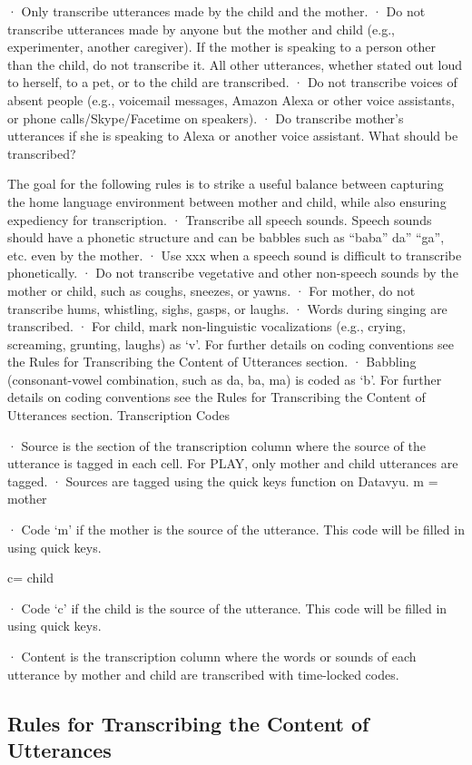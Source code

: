 \documentclass[
  12pt,
]{book}
\begin{document}
· Only transcribe utterances made by the child and the mother.
· Do not transcribe utterances made by anyone but the mother and child (e.g., experimenter, another caregiver). If the mother is speaking to a person other than the child, do not transcribe it. All other utterances, whether stated out loud to herself, to a pet, or to the child are transcribed.
· Do not transcribe voices of absent people (e.g., voicemail messages, Amazon Alexa or other voice assistants, or phone calls/Skype/Facetime on speakers).
· Do transcribe mother's utterances if she is speaking to Alexa or another voice assistant.
What should be transcribed?

The goal for the following rules is to strike a useful balance between capturing the home language environment between mother and child, while also ensuring expediency for transcription.
· Transcribe all speech sounds. Speech sounds should have a phonetic structure and can be babbles such as ``baba'' da'' ``ga'', etc. even by the mother.
· Use xxx when a speech sound is difficult to transcribe phonetically.
· Do not transcribe vegetative and other non-speech sounds by the mother or child, such as coughs, sneezes, or yawns.
· For mother, do not transcribe hums, whistling, sighs, gasps, or laughs.
· Words during singing are transcribed.
· For child, mark non-linguistic vocalizations (e.g., crying, screaming, grunting, laughs) as `v'. For further details on coding conventions see the Rules for Transcribing the Content of Utterances section.
· Babbling (consonant-vowel combination, such as da, ba, ma) is coded as `b'. For further details on coding conventions see the Rules for Transcribing the Content of Utterances section.
Transcription Codes

· Source is the section of the transcription column where the source of the utterance is tagged in each cell. For PLAY, only mother and child utterances are tagged.
· Sources are tagged using the quick keys function on Datavyu.
m = mother

· Code `m' if the mother is the source of the utterance. This code will be filled in using quick keys.

c= child

· Code `c' if the child is the source of the utterance. This code will be filled in using quick keys.

· Content is the transcription column where the words or sounds of each utterance by mother and child are transcribed with time-locked codes.

\hypertarget{rules-for-transcribing-the-content-of-utterances}{%
\subsection{Rules for Transcribing the Content of Utterances}\label{rules-for-transcribing-the-content-of-utterances}}
\end{document}
